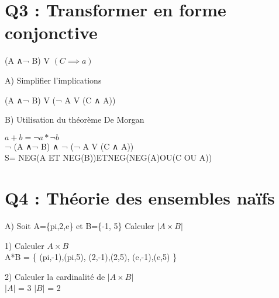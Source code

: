 \section{Q3 : Transformer en forme conjonctive}

\vspace{4mm} %

(A ∧¬ B) V $(C\implies a)$ \\

\begin{flushleft}
A) Simplifier l’implications \\
\end{flushleft}

  (A ∧¬ B) V (¬ A V (C ∧ A))\\

\begin{flushleft}
B) Utilisation du théorème De Morgan \\
\end{flushleft}

  $a+b = ¬ a * ¬ b$\\

  ¬ (A ∧¬ B) ∧ ¬ (¬ A V (C ∧ A)) \\

  S= NEG(A ET NEG(B))ETNEG(NEG(A)OU(C OU A)) \\


\vspace{10mm} %

\section{Q4 : Théorie des ensembles naïfs}

\vspace{4mm} %

A) Soit A=\{pi,2,e\} et B=\{-1, 5\} Calculer ${|A\times B|}$ \\

\vspace{4mm} %

  1) Calculer ${A\times B}$ \\

  A*B = \{ (pi,-1),(pi,5), (2,-1),(2,5), (e,-1),(e,5) \}

  \vspace{8mm} %

    2) Calculer la cardinalité de ${|A\times B|}$ \\

      ${|A|}$ = 3  ${|B|}$ = 2 \\


